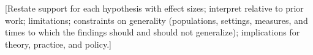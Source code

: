 \documentclass[man,floatsintext]{apa7}
\begin{document}
[Restate support for each hypothesis with effect sizes; interpret relative to
prior work; limitations; constraints on generality (populations, settings,
measures, and times to which the findings should and should not generalize);
implications for theory, practice, and policy.]

\printbibliography

\end{document}
